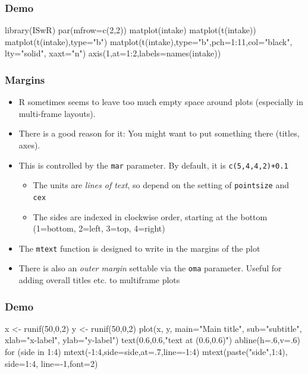 \documentclass[xcolor=svgnames]{beamer}
\newcommand{\code}[1]{\texttt{#1}}
\let\overbatim\verbatim
\let\endoverbatim\endverbatim
\newenvironment{vcode}%
{\bgroup\baselineskip=0.8\baselineskip\overbatim}%
{\endoverbatim\egroup}
\newcounter{demo}
\newcommand{\Demo}{\stepcounter{demo}\frametitle{Demo \arabic{demo}}}
\begin{document}
\begin{frame}[fragile]
  \Demo
\begin{vcode}
library(ISwR)
par(mfrow=c(2,2))
matplot(intake)
matplot(t(intake))
matplot(t(intake),type="b")
matplot(t(intake),type="b",pch=1:11,col="black",
        lty="solid", xaxt="n")
axis(1,at=1:2,labels=names(intake))
\end{vcode}
\end{frame}

\begin{frame}
  \frametitle{Margins}
  \begin{itemize}
  \item R sometimes seems to leave too much empty space around plots
    (especially in multi-frame layouts).
  \item There is a good reason for it: You might want to put something
    there (titles, axes).
  \item This is controlled by the \code{mar} parameter. By default, it is
    \code{c(5,4,4,2)+0.1}
    \begin{itemize}
      \item The units are \emph{lines of text}, so depend on the setting of
      \code{pointsize} and \code{cex}
      \item The sides are indexed in clockwise order, starting at the bottom
      (1=bottom, 2=left, 3=top, 4=right)
      \end{itemize}   
  \item The \code{mtext} function is designed to write in the margins
    of the plot
  \item There is also an \emph{outer margin} settable via the
    \code{oma} parameter. Useful for adding overall titles etc. to
    multiframe plots
  \end{itemize}
\end{frame}

\begin{frame}[fragile]
  \Demo
  \begin{vcode}
x <- runif(50,0,2)
y <- runif(50,0,2)
plot(x, y, main="Main title", sub="subtitle",
     xlab="x-label", ylab="y-label")
text(0.6,0.6,"text at (0.6,0.6)")
abline(h=.6,v=.6)
for (side in 1:4) 
   mtext(-1:4,side=side,at=.7,line=-1:4)
mtext(paste("side",1:4), side=1:4, line=-1,font=2)
  \end{vcode}
\end{frame}
\end{document}
